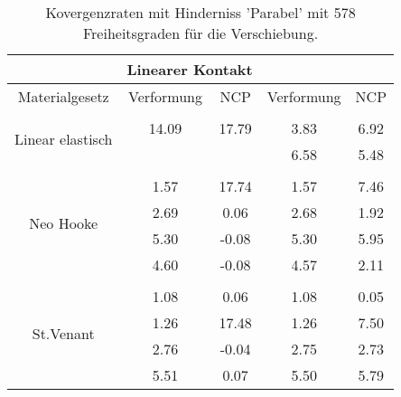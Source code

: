 \begin{table} 
\centering 
\begin{tabular}{c|cc|cc|} 
\cline{2-5} 
 & \multicolumn{2}{|c|}{Linearer Kontakt} &  \\ 
\hline 
\multicolumn{1}{|c|}{Materialgesetz} & \multicolumn{1}{c|}{Verformung} & \multicolumn{1}{c|}{NCP} & \multicolumn{1}{c|}{Verformung} & \multicolumn{1}{c|}{NCP} \\ 
\hline 
\multicolumn{1}{|c|}{\multirow{3}{*}{Linear elastisch}} &\multicolumn{1}{|c|}{} & \multicolumn{1}{|c|}{} & \multicolumn{1}{|c|}{} & \multicolumn{1}{|c|}{} \\ 
\multicolumn{1}{|c|}{} & \multicolumn{1}{|c|}{     14.09} & \multicolumn{1}{|c|}{     17.79} & \multicolumn{1}{|c|}{      3.83} & \multicolumn{1}{|c|}{      6.92} \\ 
\multicolumn{1}{|c|}{} & \multicolumn{1}{|c|}{} & \multicolumn{1}{|c|}{} & \multicolumn{1}{|c|}{      6.58} & \multicolumn{1}{|c|}{      5.48} \\ 
\hline 
\multicolumn{1}{|c|}{\multirow{5}{*}{Neo Hooke}} &\multicolumn{1}{|c|}{} & \multicolumn{1}{|c|}{} & \multicolumn{1}{|c|}{} & \multicolumn{1}{|c|}{} \\ 
\multicolumn{1}{|c|}{} & \multicolumn{1}{|c|}{      1.57} & \multicolumn{1}{|c|}{     17.74} & \multicolumn{1}{|c|}{      1.57} & \multicolumn{1}{|c|}{      7.46} \\ 
\multicolumn{1}{|c|}{} & \multicolumn{1}{|c|}{      2.69} & \multicolumn{1}{|c|}{      0.06} & \multicolumn{1}{|c|}{      2.68} & \multicolumn{1}{|c|}{      1.92} \\ 
\multicolumn{1}{|c|}{} & \multicolumn{1}{|c|}{      5.30} & \multicolumn{1}{|c|}{     -0.08} & \multicolumn{1}{|c|}{      5.30} & \multicolumn{1}{|c|}{      5.95} \\ 
\multicolumn{1}{|c|}{} & \multicolumn{1}{|c|}{      4.60} & \multicolumn{1}{|c|}{     -0.08} & \multicolumn{1}{|c|}{      4.57} & \multicolumn{1}{|c|}{      2.11} \\ 
\hline 
\multicolumn{1}{|c|}{\multirow{5}{*}{St.Venant}} &\multicolumn{1}{|c|}{} & \multicolumn{1}{|c|}{} & \multicolumn{1}{|c|}{} & \multicolumn{1}{|c|}{} \\ 
\multicolumn{1}{|c|}{} & \multicolumn{1}{|c|}{      1.08} & \multicolumn{1}{|c|}{      0.06} & \multicolumn{1}{|c|}{      1.08} & \multicolumn{1}{|c|}{      0.05} \\ 
\multicolumn{1}{|c|}{} & \multicolumn{1}{|c|}{      1.26} & \multicolumn{1}{|c|}{     17.48} & \multicolumn{1}{|c|}{      1.26} & \multicolumn{1}{|c|}{      7.50} \\ 
\multicolumn{1}{|c|}{} & \multicolumn{1}{|c|}{      2.76} & \multicolumn{1}{|c|}{     -0.04} & \multicolumn{1}{|c|}{      2.75} & \multicolumn{1}{|c|}{      2.73} \\ 
\multicolumn{1}{|c|}{} & \multicolumn{1}{|c|}{      5.51} & \multicolumn{1}{|c|}{      0.07} & \multicolumn{1}{|c|}{      5.50} & \multicolumn{1}{|c|}{      5.79} \\ 
\hline 
\end{tabular}\caption{Kovergenzraten mit Hinderniss 'Parabel' mit 578 Freiheitsgraden für die Verschiebung.}\label{tab:Rate_Parabel_level3}
\end{table} 
